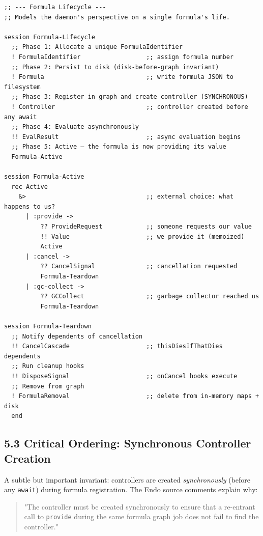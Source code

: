 \documentclass[11pt]{article}
\begin{document}
\begin{verbatim}
;; --- Formula Lifecycle ---
;; Models the daemon's perspective on a single formula's life.

session Formula-Lifecycle
  ;; Phase 1: Allocate a unique FormulaIdentifier
  ! FormulaIdentifier                  ;; assign formula number
  ;; Phase 2: Persist to disk (disk-before-graph invariant)
  ! Formula                            ;; write formula JSON to filesystem
  ;; Phase 3: Register in graph and create controller (SYNCHRONOUS)
  ! Controller                         ;; controller created before any await
  ;; Phase 4: Evaluate asynchronously
  !! EvalResult                        ;; async evaluation begins
  ;; Phase 5: Active — the formula is now providing its value
  Formula-Active

session Formula-Active
  rec Active
    &>                                 ;; external choice: what happens to us?
      | :provide ->
          ?? ProvideRequest            ;; someone requests our value
          !! Value                     ;; we provide it (memoized)
          Active
      | :cancel ->
          ?? CancelSignal              ;; cancellation requested
          Formula-Teardown
      | :gc-collect ->
          ?? GCCollect                 ;; garbage collector reached us
          Formula-Teardown

session Formula-Teardown
  ;; Notify dependents of cancellation
  !! CancelCascade                     ;; thisDiesIfThatDies dependents
  ;; Run cleanup hooks
  !! DisposeSignal                     ;; onCancel hooks execute
  ;; Remove from graph
  ! FormulaRemoval                     ;; delete from in-memory maps + disk
  end
\end{verbatim}
\subsection{5.3 Critical Ordering: Synchronous Controller Creation}
\label{sec:orgd355c77}

A subtle but important invariant: controllers are created \emph{synchronously}
(before any \texttt{await}) during formula registration. The Endo source comments
explain why:

\begin{quote}
"The controller must be created synchronously to ensure that a re-entrant
call to \texttt{provide} during the same formula graph job does not fail to find
the controller."
\end{quote}
\end{document}
